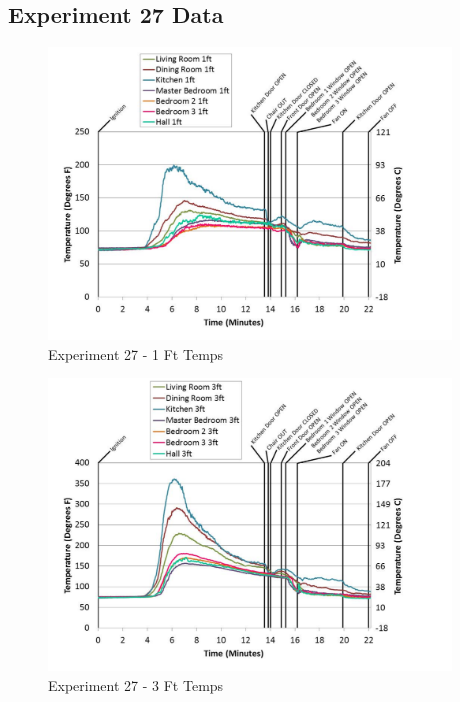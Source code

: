 \documentclass{article}
\begin{document}
\begin{appendices}
	\clearpage

		\clearpage
\clearpage		\large
\subsection{Experiment 27 Data} \label{App:Exp27Results} 

	\begin{figure}[h!]
		\centering
		\includegraphics[height=3.05in]{0_Images/Results_Charts/Exp_27_Charts/1FtTemps.pdf}
		\caption{Experiment 27 - 1 Ft Temps}
	\end{figure}
 

	\begin{figure}[h!]
		\centering
		\includegraphics[height=3.05in]{0_Images/Results_Charts/Exp_27_Charts/3FtTemps.pdf}
		\caption{Experiment 27 - 3 Ft Temps}
	\end{figure}
 
	\clearpage


\end{appendices}
\end{document}
